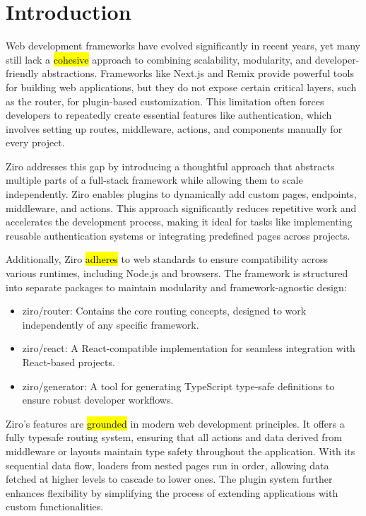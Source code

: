 \section{Introduction}

Web development frameworks have evolved significantly in recent years, yet many still lack a \hl{cohesive} approach to combining scalability, modularity, and developer-friendly abstractions. Frameworks like Next.js and Remix provide powerful tools for building web applications, but they do not expose certain critical layers, such as the router, for plugin-based customization. This limitation often forces developers to repeatedly create essential features like authentication, which involves setting up routes, middleware, actions, and components manually for every project.

Ziro addresses this gap by introducing a thoughtful approach that abstracts multiple parts of a full-stack framework while allowing them to scale independently. Ziro enables plugins to dynamically add custom pages, endpoints, middleware, and actions. This approach significantly reduces repetitive work and accelerates the development process, making it ideal for tasks like implementing reusable authentication systems or integrating predefined pages across projects.

Additionally, Ziro \hl{adheres} to web standards to ensure compatibility across various runtimes, including Node.js and browsers. The framework is structured into separate packages to maintain modularity and framework-agnostic design:

\begin{itemize}
	\item ziro/router: Contains the core routing concepts, designed to work independently of any specific framework.

	\item ziro/react: A React-compatible implementation for seamless integration with React-based projects.

	\item ziro/generator: A tool for generating TypeScript type-safe definitions to ensure robust developer workflows.
\end{itemize}

Ziro’s features are \hl{grounded} in modern web development principles. It offers a fully typesafe routing system, ensuring that all actions and data derived from middleware or layouts maintain type safety throughout the application. With its sequential data flow, loaders from nested pages run in order, allowing data fetched at higher levels to cascade to lower ones. The plugin system further enhances flexibility by simplifying the process of extending applications with custom functionalities.

